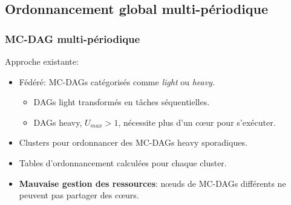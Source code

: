 \documentclass[xcolor=table]{beamer}
\begin{document}
\subsection {Ordonnancement global multi-périodique}
\newcommand{\light}[1]{\textcolor{gray}{#1}}

\begin{frame}
	\frametitle{MC-DAG multi-périodique}
	Approche existante:
	\begin{itemize}
		\item Fédéré: MC-DAGs catégorisés comme \emph{light} ou \emph{heavy}.
		\begin{itemize}
			\item DAGs light transformés en tâches séquentielles.
			\item DAGs heavy, $U_{max} > 1$, nécessite plus d'un c\oe{}ur pour s'exécuter.
		\end{itemize}
		\item Clusters pour ordonnancer des MC-DAGs heavy sporadiques.
		\item Tables d'ordonnancement calculées pour chaque cluster.
		\item \textbf{Mauvaise gestion des ressources}: n\oe{}uds de MC-DAGs différents ne peuvent pas 
		partager des c\oe{}urs.
	\end{itemize}
\end{frame}

\end{document}
